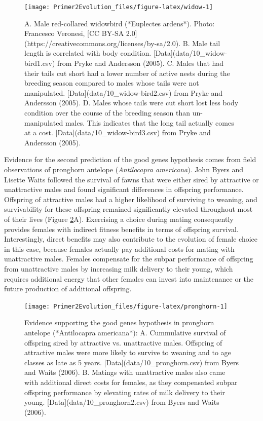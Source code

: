 \documentclass[
]{book}
\begin{document}
\begin{figure}
\texttt{[image: Primer2Evolution\_files/figure-latex/widow-1]} \caption{A. Male red-collared widowbird (*Euplectes ardens*). Photo: Francesco Veronesi, [CC BY-SA 2.0](https://creativecommons.org/licenses/by-sa/2.0). B. Male tail length is correlated with body condition. [Data](data/10_widow-bird1.csv) from Pryke and Andersson (2005). C. Males that had their tails cut short had a lower number of active nests during the breeding season compared to males whose tails were not manipulated. [Data](data/10_widow-bird2.csv) from Pryke and Andersson (2005). D. Males whose tails were cut short lost less body condition over the course of the breeding season than un-manipulated males. This indicates that the long tail actually comes at a cost. [Data](data/10_widow-bird3.csv) from Pryke and Andersson (2005).}\label{fig:widow}
\end{figure}

Evidence for the second prediction of the good genes hypothesis comes from field observations of pronghorn antelope (\emph{Antilocapra americana}). John Byers and Lisette Waits followed the survival of fawns that were either sired by attractive or unattractive males and found significant differences in offspring performance. Offspring of attractive males had a higher likelihood of surviving to weaning, and survivability for these offspring remained significantly elevated throughout most of their lives (Figure \ref{fig:pronghorn}A). Exercising a choice during mating consequently provides females with indirect fitness benefits in terms of offspring survival. Interestingly, direct benefits may also contribute to the evolution of female choice in this case, because females actually pay additional costs for mating with unattractive males. Females compensate for the subpar performance of offspring from unattractive males by increasing milk delivery to their young, which requires additional energy that other females can invest into maintenance or the future production of additional offspring.

\begin{figure}
\texttt{[image: Primer2Evolution\_files/figure-latex/pronghorn-1]} \caption{Evidence supporting the good genes hypothesis in pronghorn antelope (*Antilocapra americana*): A. Cummulative survival of offspring sired by attractive vs. unattractive males. Offspring of attractive males were more likely to survive to weaning and to age classes as late as 5 years. [Data](data/10_pronghorn.csv) from Byers and Waits (2006). B. Matings with unattractive males also came with additional direct costs for females, as they compensated subpar offspring performance by elevating rates of milk delivery to their young. [Data](data/10_pronghorn2.csv) from Byers and Waits (2006).}\label{fig:pronghorn}
\end{figure}
\end{document}
